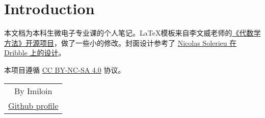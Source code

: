 \chapter*{Introduction}
	本文档为本科生微电子专业课的个人笔记。\LaTeX 模板来自李文威老师的\href{https://github.com/wenweili/AlJabr-1}{《代数学方法》开源项目}，做了一些小的修改。封面设计参考了 \href{https://dribbble.com/shots/21647162-Bento-boxes}{Nicolas Solerieu 在 Dribble 上的设计}。

	本项目遵循 \href{https://creativecommons.org/licenses/by-nc-sa/4.0/}{CC BY-NC-SA 4.0} 协议。
	\vspace{1em}
	\begin{flushright}\begin{minipage}{0.2 \textwidth}
		\begin{tabular}{c}
			{By Imiloin} \\
			\href{https://github.com/Imiloin}{Github profile}\\
		\end{tabular}
	\end{minipage}\end{flushright}
